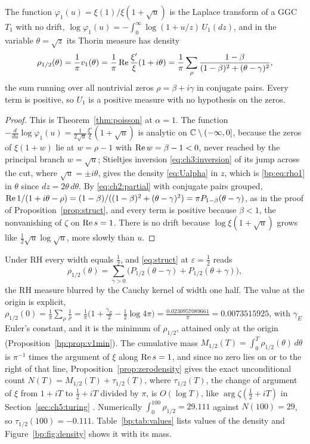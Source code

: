\begin{proposition}\label{bp:prop:thorin}
The function $\varphi_1(u)=\xi(1)/\xi(1+\sqrt u)$ is the Laplace transform of a GGC $T_1$ with no drift, $\log\varphi_1(u)=-\int_0^\infty\log(1+u/z)\,U_1(dz)$, and in the variable $\theta=\sqrt z$ its Thorin measure has density
\begin{equation}\label{bp:eq:rho1}
\rho_{1/2}(\theta)=\frac1\pi v_1(\theta)=\frac1\pi\operatorname{Re}\frac{\xi'}{\xi}(1+i\theta)=\frac1\pi\sum_\rho\frac{1-\beta}{(1-\beta)^2+(\theta-\gamma)^2},
\end{equation}
the sum running over all nontrivial zeros $\rho=\beta+i\gamma$ in conjugate pairs. Every term is positive, so $U_1$ is a positive measure with no hypothesis on the zeros.
\end{proposition}

\begin{proof}
This is Theorem~\ref{thm:poisson} at $\alpha=1$. The function $-\frac{d}{du}\log\varphi_1(u)=\frac{1}{2\sqrt u}\frac{\xi'}{\xi}(1+\sqrt u)$ is analytic on $\mathbb{C}\setminus(-\infty,0]$, because the zeros of $\xi(1+w)$ lie at $w=\rho-1$ with $\operatorname{Re} w=\beta-1<0$, never reached by the principal branch $w=\sqrt u$; Stieltjes inversion \eqref{eq:ch3:inversion} of its jump across the cut, where $\sqrt u=\pm i\theta$, gives the density \eqref{eq:Ualpha} in $z$, which is \eqref{bp:eq:rho1} in $\theta$ since $dz=2\theta\,d\theta$. By \eqref{eq:ch2:partial} with conjugate pairs grouped, $\operatorname{Re}1/(1+i\theta-\rho)=(1-\beta)/((1-\beta)^2+(\theta-\gamma)^2)=\pi P_{1-\beta}(\theta-\gamma)$, as in the proof of Proposition~\ref{prop:struct}, and every term is positive because $\beta<1$, the nonvanishing of $\zeta$ on $\operatorname{Re} s=1$. There is no drift because $\log\xi(1+\sqrt u)$ grows like $\frac12\sqrt u\log\sqrt u$, more slowly than $u$.
\end{proof}

Under RH every width equals $\frac12$, and \eqref{eq:struct} at $\varepsilon=\frac12$ reads
\[
\rho_{1/2}(\theta)=\sum_{\gamma>0}\Big(P_{1/2}(\theta-\gamma)+P_{1/2}(\theta+\gamma)\Big),
\]
the RH measure blurred by the Cauchy kernel of width one half. The value at the origin is explicit, $\rho_{1/2}(0)=\frac1\pi\sum_\rho\frac1\rho=\frac1\pi\big(1+\frac{\gamma_E}2-\frac12\log4\pi\big)=\frac{0.0230957089661}\pi=0.0073515925$, with $\gamma_E$ Euler's constant, and it is the minimum of $\rho_{1/2}$, attained only at the origin (Proposition~\ref{bp:prop:v1min}). The cumulative mass $M_{1/2}(T)=\int_0^T\rho_{1/2}(\theta)\,d\theta$ is $\pi^{-1}$ times the argument of $\xi$ along $\operatorname{Re} s=1$, and since no zero lies on or to the right of that line, Proposition~\ref{prop:zerodensity} gives the exact unconditional count $N(T)=M_{1/2}(T)+\tau_{1/2}(T)$, where $\tau_{1/2}(T)$, the change of argument of $\xi$ from $1+iT$ to $\frac12+iT$ divided by $\pi$, is $O(\log T)$, like $\arg\zeta(\frac12+iT)$ in Section~\ref{sec:ch5:turing} \cite{Titchmarsh}. Numerically $\int_0^{100}\rho_{1/2}=29.111$ against $N(100)=29$, so $\tau_{1/2}(100)=-0.111$. Table~\ref{bp:tab:values} lists values of the density and Figure~\ref{bp:fig:density} shows it with its mass.

